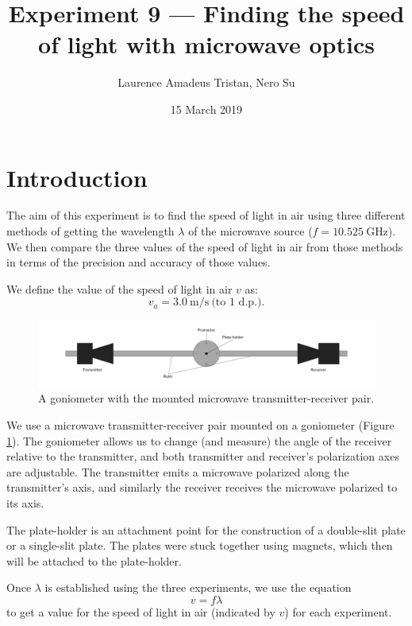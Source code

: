 \documentclass[letter,12pt]{article}
\title{Experiment 9 --- Finding the speed of light with microwave optics}
\author{Laurence Amadeus Tristan, Nero Su}
\date{15 March 2019}
\newcommand{\tlambda}{\(\lambda\) }
\numberwithin{equation}{section}
\numberwithin{figure}{section}
\numberwithin{table}{section}
\begin{document}
\maketitle

\section{Introduction}
The aim of this experiment is to find the speed of light in air using three different methods of getting the wavelength \tlambda of the microwave source (\(f = \SI{10.525}{\giga\hertz}\)). We then compare the three values of the speed of light in air from those methods in terms of the precision and accuracy of those values.

We define the value of the speed of light in air \(v\) as:
\[ v_a = \SI{3.0}{\metre\per\second} \ \text{(to 1 d.p.)}. \]

\begin{figure}[!ht]
  \centering
  \includegraphics[width=\textwidth]{goniometer.pdf}
  \caption{A goniometer with the mounted microwave transmitter-receiver pair.}
  \label{fig:i1}
\end{figure}

We use a microwave transmitter-receiver pair mounted on a goniometer (Figure \ref{fig:i1}). The goniometer allows us to change (and measure) the angle of the receiver relative to the transmitter, and both transmitter and receiver's polarization axes are adjustable. The transmitter emits a microwave polarized along the transmitter's axis, and similarly the receiver receives the microwave polarized to its axis.

The plate-holder is an attachment point for the construction of a double-slit plate or a single-slit plate. The plates were stuck together using magnets, which then will be attached to the plate-holder. \pagebreak[4]

Once \tlambda is established using the three experiments, we use the equation
\begin{equation} \label{eq:i1}
  v = f \lambda
\end{equation}
to get a value for the speed of light in air (indicated by \(v\)) for each experiment.
\end{document}
